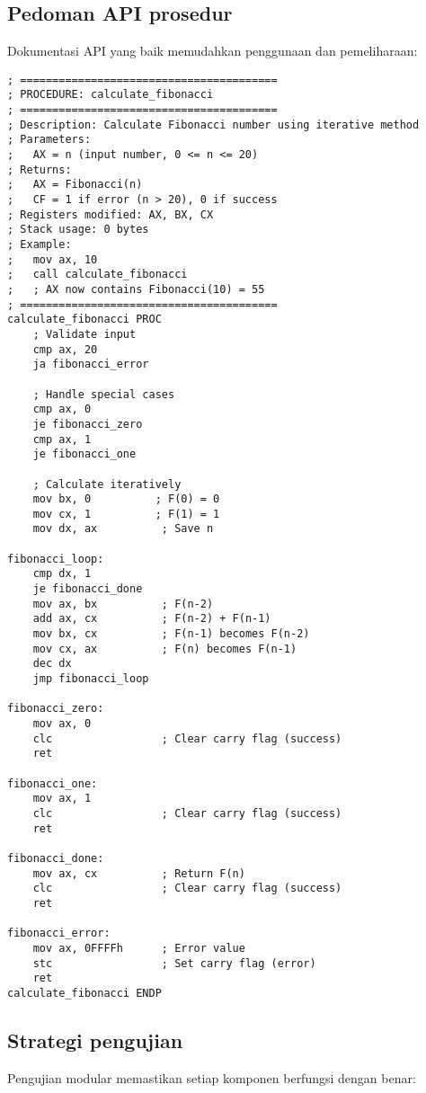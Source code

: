 \documentclass[../main.tex]{subfiles}
\begin{document}
        \subsection{Pedoman API prosedur}
            Dokumentasi API yang baik memudahkan penggunaan dan pemeliharaan:

            \begin{lstlisting}[language={[x86masm]Assembler}, caption=Contoh Dokumentasi API, label={lst:api-documentation}]
; ========================================
; PROCEDURE: calculate_fibonacci
; ========================================
; Description: Calculate Fibonacci number using iterative method
; Parameters: 
;   AX = n (input number, 0 <= n <= 20)
; Returns:
;   AX = Fibonacci(n)
;   CF = 1 if error (n > 20), 0 if success
; Registers modified: AX, BX, CX
; Stack usage: 0 bytes
; Example:
;   mov ax, 10
;   call calculate_fibonacci
;   ; AX now contains Fibonacci(10) = 55
; ========================================
calculate_fibonacci PROC
    ; Validate input
    cmp ax, 20
    ja fibonacci_error
    
    ; Handle special cases
    cmp ax, 0
    je fibonacci_zero
    cmp ax, 1
    je fibonacci_one
    
    ; Calculate iteratively
    mov bx, 0          ; F(0) = 0
    mov cx, 1          ; F(1) = 1
    mov dx, ax          ; Save n
    
fibonacci_loop:
    cmp dx, 1
    je fibonacci_done
    mov ax, bx          ; F(n-2)
    add ax, cx          ; F(n-2) + F(n-1)
    mov bx, cx          ; F(n-1) becomes F(n-2)
    mov cx, ax          ; F(n) becomes F(n-1)
    dec dx
    jmp fibonacci_loop
    
fibonacci_zero:
    mov ax, 0
    clc                 ; Clear carry flag (success)
    ret
    
fibonacci_one:
    mov ax, 1
    clc                 ; Clear carry flag (success)
    ret
    
fibonacci_done:
    mov ax, cx          ; Return F(n)
    clc                 ; Clear carry flag (success)
    ret
    
fibonacci_error:
    mov ax, 0FFFFh      ; Error value
    stc                 ; Set carry flag (error)
    ret
calculate_fibonacci ENDP
            \end{lstlisting}

        \subsection{Strategi pengujian}
            Pengujian modular memastikan setiap komponen berfungsi dengan benar:
\end{document}
